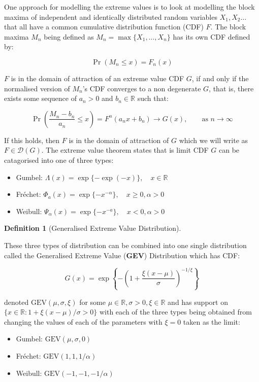 \documentclass[
  10pt,
  a4paper,
]{scrreprt}
\theoremstyle{definition}
\newtheorem{definition}{Definition}[section]
\theoremstyle{remark}
\begin{document}
{One approach for modelling the extreme values is to look at modelling
the block maxima of independent and identically distributed random
variables \(X_1,X_2 \ldots\) that all have a common cumulative
distribution function (CDF) \(F\). The block maxima \(M_n\) being
defined as \(M_n = \max\{X_1,\ldots,X_n\}\) has its own CDF defined by:

\[
\Pr(M_n\le x) = F_n(x)
\]

\(F\) is in the domain of attraction of an extreme value CDF \(G\), if
and only if the normalised version of \(M_n\)'s CDF converges to a non
degenerate \(G\), that is, there exists some sequence of \(a_n>0\) and
\(b_n \in \mathbb R\) such that:

\[
\Pr\left(\frac{M_n-b_n}{a_n}\le x\right) = F^n(a_nx+b_n) \rightarrow G(x),\qquad \text{as }n\rightarrow\infty
\]

If this holds, then \(F\) is in the domain of attraction of \(G\) which
we will write as \(F\in\mathcal D(G)\). The extreme value theorem states
that is limit CDF \(G\) can be catagorised into one of three types:

\begin{itemize}
\item
  Gumbel: \(\Lambda(x) = \exp\{-\exp(-x)\},\quad x\in \mathbb R\)
\item
  Fréchet: \(\Phi_a(x) = \exp\{-x^{-\alpha}\},\quad x\ge 0,\alpha>0\)
\item
  Weibull: \(\Psi_\alpha(x) = \exp\{-x^{-a}\},\quad x<0,\alpha>0\)
\end{itemize}

\begin{definition}[Generalised Extreme Value
Distribution]\protect\hypertarget{def-gev}{}\label{def-gev}

These three types of distribution can be combined into one single
distribution called the Generalised Extreme Value (\textbf{GEV})
Distribution which has CDF:

\[
G(x) = \exp\left\{-\left(1+\frac{\xi(x-\mu)}{\sigma}\right)^{-1/\xi}\right\}
\]

denoted \(\text{GEV}(\mu, \sigma, \xi)\) for some
\(\mu\in\mathbb R,\sigma>0, \xi \in \mathbb R\) and has support on
\(\{x\in \mathbb R:1+\xi(x-\mu)/\sigma > 0\}\) with each of the three
types being obtained from changing the values of each of the parameters
with \(\xi=0\) taken as the limit:

\begin{itemize}
\item
  Gumbel: \(\text{GEV}(\mu, \sigma,0)\)
\item
  Fréchet: \(\text{GEV}(1, 1,1/\alpha)\)
\item
  Weibull: \(\text{GEV}(-1, -1,-1/\alpha)\)
\end{itemize}


\end{definition}}
\end{document}
